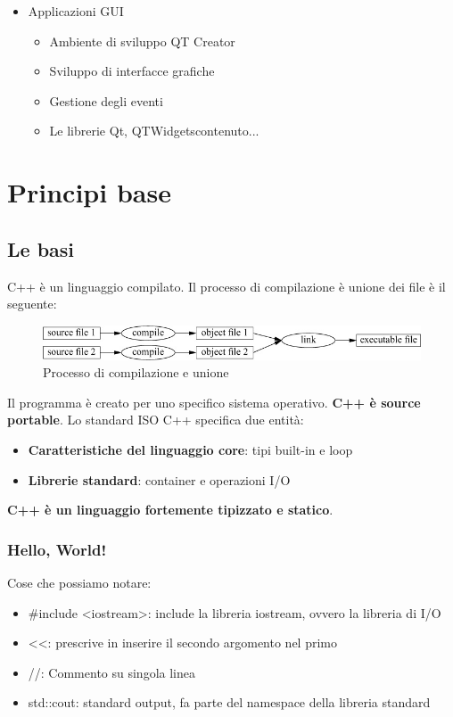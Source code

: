 \documentclass[11pt,a4paper]{book}
\begin{document}
\begin{itemize}
	\item Applicazioni GUI
	\begin{itemize}
		\item Ambiente di sviluppo QT Creator
		\item Sviluppo di interfacce grafiche
		\item Gestione degli eventi
		\item Le librerie Qt, QTWidgetscontenuto...
	\end{itemize}
\end{itemize}
\pagebreak

\chapter{Principi base}
\section{Le basi}
C++ è un linguaggio compilato. Il processo di compilazione è unione dei file è il seguente:
\begin{figure}[h!]
	\begin{center}
		\includegraphics[scale=0.6]{img/001.jpg}
		\caption{Processo di compilazione e unione}
		\label{fig: 001}
	\end{center}
\end{figure}
Il programma è creato per uno specifico sistema operativo. \textbf{C++ è source portable}. Lo standard ISO C++ specifica due entità:
\begin{itemize}
	\item \textbf{Caratteristiche del linguaggio core}: tipi built-in e loop
	\item \textbf{Librerie standard}: container e operazioni I/O
\end{itemize}
\textbf{C++ è un linguaggio fortemente tipizzato e statico}.

\subsection{Hello, World!}
\label{code: 001}
Cose che possiamo notare:
\begin{itemize}
	\item \#include <iostream>: include la libreria iostream, ovvero la libreria di I/O
	\item <<: prescrive in inserire il secondo argomento nel primo
	\item //: Commento su singola linea
	\item std::cout: standard output, fa parte del namespace della libreria standard
\end{itemize}
\end{document}
